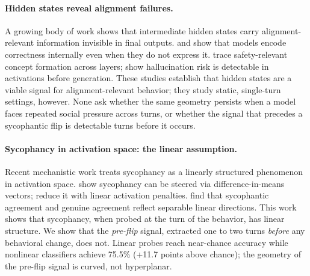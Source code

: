 \documentclass[11pt]{article}
\begin{document}
\paragraph{Hidden states reveal alignment failures.}
A growing body of work shows that intermediate hidden states carry alignment-relevant information
invisible in final outputs. \citet{burns2022discovering} and \citet{azaria2023llm} show that
models encode correctness internally even when they do not express it. \citet{zhou2024alignment} trace safety-relevant concept formation across layers; \citet{orgad2025llms} show hallucination risk is detectable in activations 
before generation. These studies establish that hidden states are a viable signal
for alignment-relevant behavior; they study static, single-turn settings, however. None ask
whether the same geometry persists when a model faces repeated social pressure across turns,
or whether the signal that precedes a sycophantic flip is detectable turns before it occurs.

\paragraph{Sycophancy in activation space: the linear assumption.}
Recent mechanistic work treats sycophancy as a linearly structured phenomenon in activation
space. \citet{rimsky2024steering} show sycophancy can be steered via difference-in-means vectors; \citet{papadatos2024linear} reduce it with linear activation penalties. \citet{vennemeyer2026} find that sycophantic agreement and
genuine agreement reflect separable linear directions. This work shows that sycophancy, when
probed at the turn of the behavior, has linear structure. We show that the \textit{pre-flip}
signal, extracted one to two turns \textit{before} any behavioral change, does not.
Linear probes reach near-chance accuracy while nonlinear classifiers achieve 75.5\% (+11.7 points above chance); the geometry of the pre-flip signal is curved, not hyperplanar.

\end{document}
